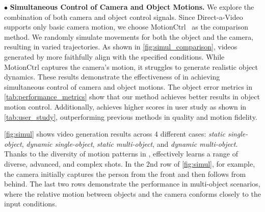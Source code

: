 \begin{table}[t]
\centering
\caption{Quantitative results in ablation study.}
\label{tab:ablation_quantitative}
\vspace{-3mm}
\footnotesize
\setlength{\tabcolsep}{0.6mm}
\vspace{-7mm}
\end{table}


\vspace{-.5mm}
\noindent$\bullet$
\textbf{Simultaneous Control of Camera and Object Motions.} We explore the combination of both camera and object control signals. Since Direct-a-Video~\cite{Direct-A-Video} supports only basic camera motion, we choose MotionCtrl~\cite{MotionCtrl} as the comparison method. We randomly simulate movements for both the object and the camera, resulting in varied trajectories. As shown in \cref{fig:simul_comparison}, videos generated by \methodname more faithfully align with the specified conditions. While MotionCtrl captures the camera’s motion, it struggles to generate realistic object dynamics. 
These results demonstrate the effectiveness of \methodname in achieving simultaneous control of camera and object motions. The object error metrics in \cref{tab:performance_metrics} show that our method achieves better results in object motion control. Additionally, \methodname achieves higher scores in user study as shown in \cref{tab:user_study}, outperforming previous methods in quality and motion fidelity.


\cref{fig:simul} shows video generation results across 4 different cases: \textit{static single-object}, \textit{dynamic single-object}, \textit{static multi-object}, and \textit{dynamic multi-object}. Thanks to the diversity of motion patterns in \datasetname, \methodname effectively learns a range of diverse, advanced, and complex shots. In the {2nd} row of \cref{fig:simul}, for example, the camera initially captures the person from the front and then follows from behind. The last two rows demonstrate the performance in multi-object scenarios, where the relative motion between objects and the camera conforms closely to the input conditions. 


